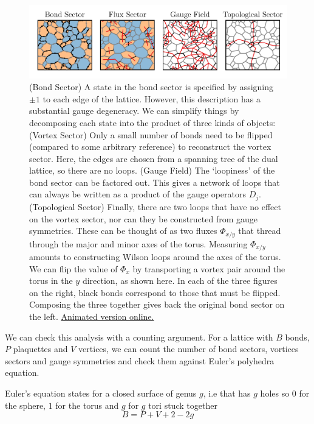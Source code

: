 \hypertarget{fig:state_decomposition_animated}{%
\begin{figure}
\centering
\includegraphics[width=1\textwidth,height=\textheight]{figure_code/amk_chapter/intro/state_decomposition_animated/state_decomposition_animated}
\caption[{State Decomposition}]{(Bond Sector) A state in the bond sector is specified by assigning \(\pm 1\) to each edge of the lattice. However, this description has a substantial gauge degeneracy. We can simplify things by decomposing each state into the product of three kinds of objects: (Vortex Sector) Only a small number of bonds need to be flipped (compared to some arbitrary reference) to reconstruct the vortex sector. Here, the edges are chosen from a spanning tree of the dual lattice, so there are no loops. (Gauge Field) The `loopiness' of the bond sector can be factored out. This gives a network of loops that can always be written as a product of the gauge operators \(D_j\). (Topological Sector) Finally, there are two loops that have no effect on the vortex sector, nor can they be constructed from gauge symmetries. These can be thought of as two fluxes \(\Phi_{x/y}\) that thread through the major and minor axes of the torus. Measuring \(\Phi_{x/y}\) amounts to constructing Wilson loops around the axes of the torus. We can flip the value of \(\Phi_{x}\) by transporting a vortex pair around the torus in the \(y\) direction, as shown here. In each of the three figures on the right, black bonds correspond to those that must be flipped. Composing the three together gives back the original bond sector on the left. \href{http://thomashodson.com/assets/thesis/figure_code/amk_chapter/intro/state_decomposition_animated/state_decomposition_animated.gif}{ Animated version online.}}
\label{fig:state_decomposition_animated}
\end{figure}
}

We can check this analysis with a counting argument. For a lattice with \(B\) bonds, \(P\) plaquettes and \(V\) vertices, we can count the number of bond sectors, vortices sectors and gauge symmetries and check them against Euler's polyhedra equation.

Euler's equation states for a closed surface of genus \(g\), i.e that has \(g\) holes so \(0\) for the sphere, \(1\) for the torus and \(g\) for \(g\) tori stuck together \[B = P + V + 2 - 2g\]

